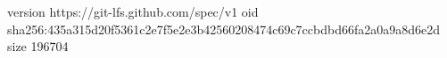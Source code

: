 version https://git-lfs.github.com/spec/v1
oid sha256:435a315d20f5361c2e7f5e2e3b42560208474c69c7ccbdbd66fa2a0a9a8d6e2d
size 196704
